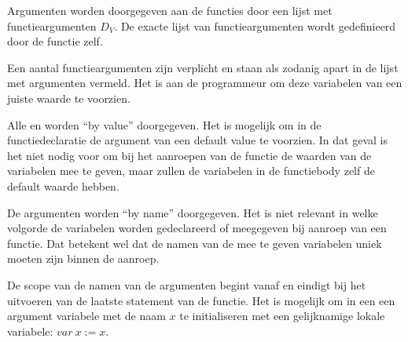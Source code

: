 Argumenten worden doorgegeven aan de functies door een lijst met functieargumenten $D_V$. De exacte lijst van
functieargumenten wordt gedefinieerd door de functie zelf.

Een aantal functieargumenten zijn verplicht en staan als zodanig apart in de lijst met argumenten vermeld. Het is aan
de programmeur om deze variabelen van een juiste waarde te voorzien.

Alle en worden ``by value'' doorgegeven. Het is mogelijk om in de functiedeclaratie de argument
van een default value te voorzien. In dat geval is het niet nodig voor om bij het aanroepen van de functie de waarden
van de variabelen mee te geven, maar zullen de variabelen in de functiebody zelf de default waarde hebben.

De argumenten worden ``by name'' doorgegeven. Het is niet relevant in welke volgorde de variabelen worden gedeclareerd of
meegegeven bij aanroep van een functie. Dat betekent wel dat de namen van de mee te geven variabelen uniek moeten zijn
binnen de aanroep.

De scope van de namen van de argumenten begint vanaf  en eindigt bij het uitvoeren van de laatste statement van de
functie. Het is mogelijk om in een  een argument variabele met de naam \(x\) te initialiseren met een
gelijknamige lokale variabele: \(var\:x:=x\).


